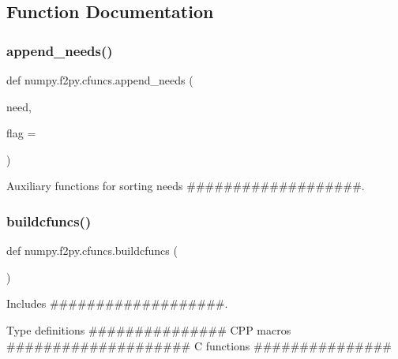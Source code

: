 \subsection{Function Documentation}
\mbox{\label{namespacenumpy_1_1f2py_1_1cfuncs_afb4068d4ede263a77accff45e7ccd1a6}} 
\subsubsection{\texorpdfstring{append\+\_\+needs()}{append\_needs()}}
{\footnotesize\ttfamily def numpy.\+f2py.\+cfuncs.\+append\+\_\+needs (\begin{DoxyParamCaption}\item[{}]{need,  }\item[{}]{flag = {} }\end{DoxyParamCaption})}



Auxiliary functions for sorting needs \#\#\#\#\#\#\#\#\#\#\#\#\#\#\#\#\#\#\#. 

\mbox{\label{namespacenumpy_1_1f2py_1_1cfuncs_a636853937d68130bf36612127aa57732}} 
\subsubsection{\texorpdfstring{buildcfuncs()}{buildcfuncs()}}
{\footnotesize\ttfamily def numpy.\+f2py.\+cfuncs.\+buildcfuncs (\begin{DoxyParamCaption}{ }\end{DoxyParamCaption})}



Includes \#\#\#\#\#\#\#\#\#\#\#\#\#\#\#\#\#\#\#. 

Type definitions \#\#\#\#\#\#\#\#\#\#\#\#\#\#\# C\+PP macros \#\#\#\#\#\#\#\#\#\#\#\#\#\#\#\#\#\#\#\# C functions \#\#\#\#\#\#\#\#\#\#\#\#\#\#\# \mbox{\label{namespacenumpy_1_1f2py_1_1cfuncs_aae5542f0788956ade12488cf6fa5f29a}} 
